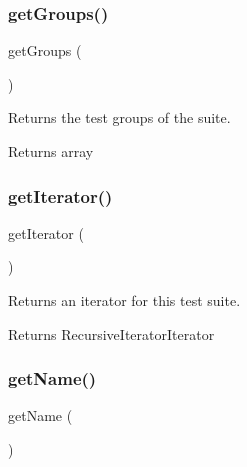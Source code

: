 \subsubsection{\texorpdfstring{get\+Groups()}{getGroups()}}
{\footnotesize\ttfamily get\+Groups (\begin{DoxyParamCaption}{ }\end{DoxyParamCaption})}

Returns the test groups of the suite.

\begin{DoxyReturn}{Returns}
array 
\end{DoxyReturn}
\mbox{\label{class_p_h_p_unit___framework___test_suite_a7a9f937c2958e6f4dd7b030f86fb70b7}} 
\subsubsection{\texorpdfstring{get\+Iterator()}{getIterator()}}
{\footnotesize\ttfamily get\+Iterator (\begin{DoxyParamCaption}{ }\end{DoxyParamCaption})}

Returns an iterator for this test suite.

\begin{DoxyReturn}{Returns}
Recursive\+Iterator\+Iterator 
\end{DoxyReturn}
\mbox{\label{class_p_h_p_unit___framework___test_suite_a3d0963e68bb313b163a73f2803c64600}} 
\subsubsection{\texorpdfstring{get\+Name()}{getName()}}
{\footnotesize\ttfamily get\+Name (\begin{DoxyParamCaption}{ }\end{DoxyParamCaption})}

